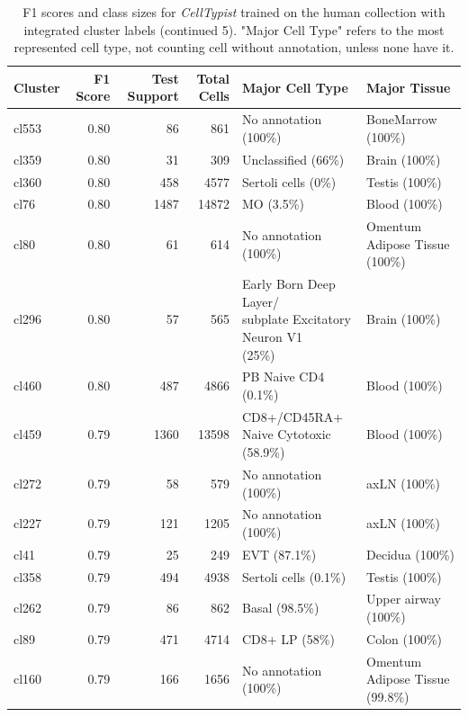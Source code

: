 \begin{table}[ht!]
\scriptsize
\caption[F1 scores and class sizes for \textit{CellTypist} trained on the human collection with integrated cluster labels (continued 5)]{F1 scores and class sizes for \textit{CellTypist} trained on the human collection with integrated cluster labels (continued 5). "Major Cell Type" refers to the most represented cell type, not counting cell without annotation, unless none have it.}
\centering
\label{table:tab_HAmodelclust5 (continued 1)}
\begin{tabular}{lrrrll}
  \toprule
Cluster & F1 Score & Test Support & Total Cells & Major Cell Type & Major Tissue \\ 
  \midrule    
  cl553 & 0.80 &  86 & 861 & No annotation (100\%) & BoneMarrow (100\%) \\ 
  cl359 & 0.80 &  31 & 309 & Unclassified (66\%) & Brain (100\%) \\ 
  cl360 & 0.80 & 458 & 4577 & Sertoli cells (0\%) & Testis (100\%) \\ 
  cl76 & 0.80 & 1487 & 14872 & MO (3.5\%) & Blood (100\%) \\ 
  cl80 & 0.80 &  61 & 614 & No annotation (100\%) & Omentum Adipose Tissue (100\%) \\ 
  cl296 & 0.80 &  57 & 565 & \specialcell[t]{Early Born Deep Layer/\\subplate Excitatory Neuron V1\\(25\%)} & Brain (100\%) \\ 
  cl460 & 0.80 & 487 & 4866 & PB Naive CD4  (0.1\%) & Blood (100\%) \\ 
  cl459 & 0.79 & 1360 & 13598 & \specialcell[t]{CD8+/CD45RA+\\Naive Cytotoxic (58.9\%)} & Blood (100\%) \\ 
  cl272 & 0.79 &  58 & 579 & No annotation (100\%) & axLN (100\%) \\ 
  cl227 & 0.79 & 121 & 1205 & No annotation (100\%) & axLN (100\%) \\ 
  cl41 & 0.79 &  25 & 249 & EVT (87.1\%) & Decidua (100\%) \\ 
  cl358 & 0.79 & 494 & 4938 & Sertoli cells (0.1\%) & Testis (100\%) \\ 
  cl262 & 0.79 &  86 & 862 & Basal (98.5\%) & Upper airway (100\%) \\ 
  cl89 & 0.79 & 471 & 4714 & CD8+ LP (58\%) & Colon (100\%) \\ 
  cl160 & 0.79 & 166 & 1656 & No annotation (100\%) & Omentum Adipose Tissue (99.8\%) \\ 

\end{tabular}
\end{table}
